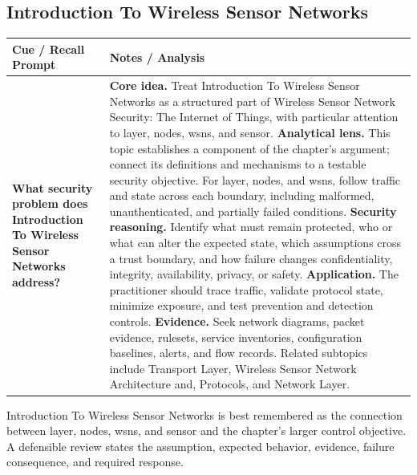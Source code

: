 \documentclass[11pt]{article}
\newcommand{\CornellHeader}{%
\rowcolor{Navy}\color{white}\bfseries Cue / Recall Prompt & \color{white}\bfseries Notes / Analysis\\\hline}
\newcommand{\CornellRow}[2]{%
\cellcolor{CueGray}\RaggedRight\textbf{#1} & \RaggedRight #2\\\hline}
\begin{document}
\subsection*{Introduction To Wireless Sensor Networks}
\begin{longtable}{>{\RaggedRight\arraybackslash}p{}|>{\RaggedRight\arraybackslash}p{}}
\CornellHeader
\CornellRow{What security problem does Introduction To Wireless Sensor Networks address?}{\textbf{Core idea.} Treat Introduction To Wireless Sensor Networks as a structured part of Wireless Sensor Network Security: The Internet of Things, with particular attention to layer, nodes, wsns, and sensor. \textbf{Analytical lens.} This topic establishes a component of the chapter's argument; connect its definitions and mechanisms to a testable security objective. For layer, nodes, and wsns, follow traffic and state across each boundary, including malformed, unauthenticated, and partially failed conditions. \textbf{Security reasoning.} Identify what must remain protected, who or what can alter the expected state, which assumptions cross a trust boundary, and how failure changes confidentiality, integrity, availability, privacy, or safety. \textbf{Application.} The practitioner should trace traffic, validate protocol state, minimize exposure, and test prevention and detection controls. \textbf{Evidence.} Seek network diagrams, packet evidence, rulesets, service inventories, configuration baselines, alerts, and flow records. Related subtopics include Transport Layer, Wireless Sensor Network Architecture and, Protocols, and Network Layer.}
\end{longtable}
\begin{topicsummary}
Introduction To Wireless Sensor Networks is best remembered as the connection between layer, nodes, wsns, and sensor and the chapter's larger control objective. A defensible review states the assumption, expected behavior, evidence, failure consequence, and required response.
\end{topicsummary}
\end{document}
